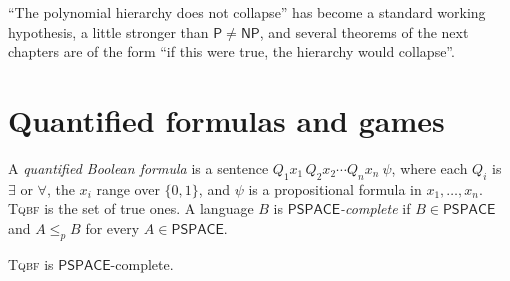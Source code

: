 ``The polynomial hierarchy does not collapse'' has become a standard working hypothesis, a little stronger than $\mathsf P\ne\mathsf{NP}$, and several theorems of the next chapters are of the form ``if this were true, the hierarchy would collapse''.

\section{Quantified formulas and games}\label{sec:pspace}

A \emph{quantified Boolean formula} is a sentence $Q_1x_1\,Q_2x_2\cdots Q_nx_n\ \psi$, where each $Q_i$ is $\exists$ or $\forall$, the $x_i$ range over $\{0,1\}$, and $\psi$ is a propositional formula in $x_1,\dots,x_n$. \textup{\textsc{Tqbf}} is the set of true ones. A language $B$ is \emph{$\mathsf{PSPACE}$-complete} if $B\in\mathsf{PSPACE}$ and $A\le_pB$ for every $A\in\mathsf{PSPACE}$.

\begin{theorem}\label{thm:tqbf}
\textup{\textsc{Tqbf}} is $\mathsf{PSPACE}$-complete.
\end{theorem}

